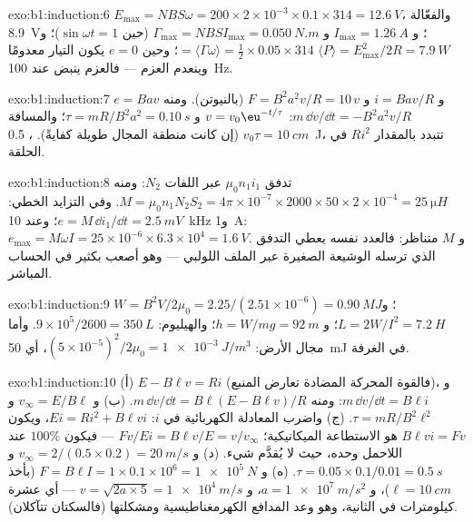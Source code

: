 \begin{solution}{exo:b1:induction:6}
$E_{\max} = NBS\omega = 200 \times 2 \times 10^{-3} \times 0.1 \times 314 = \qty{12.6}{V}$، والفعّالة
\qty{8.9}{V}؛ و $I_{\max} = \qty{1.26}{A}$ و $\Gamma_{\max} = NBSI_{\max} = \qty{0.050}{N.m}$
(حين $\sin\omega t = 1$)؛ و $\langle P\rangle = E_{\max}^2/2R = \qty{7.9}{W}$ $=
\langle\Gamma\omega\rangle = \tfrac12 \times 0.05 \times 314$؛ وحين $e = 0$ يكون التيار
معدومًا وينعدم العزم --- فالعزم ينبض عند \qty{100}{Hz}.
\end{solution}

\begin{solution}{exo:b1:induction:7}
$e = Bav$ و $i = Bav/R$ و $F = B^2a^2v/R = 10\,v$ (بالنيوتن). ومنه $m\,\dd v/\dd t = -B^2a^2v/R$:
$v = v_0\eu^{-t/\tau}$ و $\tau = mR/B^2a^2 = \qty{0.10}{s}$؛ والمسافة $v_0\tau =
\qty{10}{cm}$ (إن كانت منطقة المجال طويلة كفايةً). ،
\qty{0.5}{J}، تتبدد بالمقدار $Ri^2$ في الحلقة.
\end{solution}

\begin{solution}{exo:b1:induction:8}
تدفق  $\mu_0n_1i_1$ عبر اللفات $N_2$: ومنه $M =
\mu_0n_1N_2S_2 = 4\pi \times 10^{-7} \times 2000 \times 50 \times 2 \times 10^{-4} = \qty{25}{\micro H}$.
وفي التزايد الخطي: $e = M\,\dd i_1/\dd t = \qty{2.5}{mV}$؛ وعند \qty{10}{kHz} و\qty{1}{A}: $e_{\max} =
M\omega I = 25 \times 10^{-6} \times 6.3 \times 10^4 = \qty{1.6}{V}$. و $M$ متناظر:
فالعدد نفسه يعطي التدفق الذي ترسله الوشيعة الصغيرة عبر
الملف اللولبي --- وهو أصعب بكثير في الحساب المباشر.
\end{solution}

\begin{solution}{exo:b1:induction:9}
$W = B^2V/2\mu_0 = 2.25/(2.51 \times 10^{-6}) = \qty{0.90}{MJ}$؛ و $L = 2W/I^2 =
\qty{7.2}{H}$؛ و $h = W/mg = \qty{92}{m}$؛ والهيليوم: $9 \times 10^5/2600 = \qty{350}{L}$.
وأما مجال الأرض: $(5 \times 10^{-5})^2/2\mu_0 = \qty{1e-3}{J/m^3}$، أي \qty{50}{mJ} في
الغرفة.
\end{solution}

\begin{solution}{exo:b1:induction:10}
(أ) $E - B\ell v = Ri$ (فالقوة المحركة المضادة تعارض المنبع)، و $m\,\dd v/\dd t =
B\ell i$: ومنه $m\,\dd v/\dd t = B\ell(E - B\ell v)/R$. (ب) و $v_\infty = E/B\ell$ و $\tau =
mR/B^2\ell^2$. (ج) واضرب المعادلة الكهربائية في $i$: $Ei = Ri^2 +
B\ell vi$، ويكون $B\ell vi = Fv$ هو الاستطاعة الميكانيكية؛  $Fv/Ei =
B\ell v/E = v/v_\infty$ --- فيكون $100\%$ عند اللاحمل وحده، حيث لا يُقدَّم
شيء. (د) و $v_\infty = 2/(0.5 \times 0.2) = \qty{20}{m/s}$ و $\tau = 0.05 \times
0.1/0.01 = \qty{0.5}{s}$. (ه) و $F = B\ell I = 1 \times 0.1 \times 10^6 = \qty{1e5}{N}$
(بأخذ $\ell = \qty{10}{cm}$)، و $a = \qty{1e7}{m/s^2}$، و $v = \sqrt{2a \times 5} =
\qty{1e4}{m/s}$ --- أي عشرة كيلومترات في الثانية، وهو وعد المدافع الكهرمغناطيسية
ومشكلتها (فالسكتان تتآكلان).
\end{solution}

